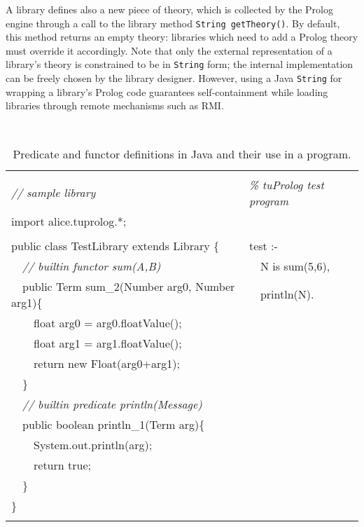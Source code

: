 %
A library defines also a new piece of theory, which is collected
by the Prolog engine through a call to the library method \texttt{String
getTheory()}.
%
By default, this method returns an empty theory: libraries which need to
add a Prolog theory must override it accordingly.
%
Note that only the external representation of a library's theory is
constrained to be in \texttt{String} form; the internal implementation
can be freely chosen by the library designer. However, using a Java
\texttt{String} for wrapping a library's Prolog code guarantees
self-containment while loading libraries through remote mechanisms such
as RMI.

\begin{table}[h]
    \caption{Predicate and functor definitions in Java and their use
    in a \tuprolog{} program.}
    \begin{center}{\small\tt
    \begin{tabular}{p{10cm}|p{3.25cm}}
     \hline
     & \\
    \textit{// sample library} & \textit{\% tuProlog test program}\\
     import alice.tuprolog.*; & \\
     & \\
    public class TestLibrary extends Library \{                            &
 test :-\\
    ~~\textit{// builtin functor sum(A,B)}                          & ~~N is sum(5,6),\\
    ~~public Term sum\_2(Number arg0, Number arg1)\{    & ~~println(N).\\
    ~~~~float   arg0 = arg0.floatValue();        & \\
    ~~~~float   arg1 = arg1.floatValue();        & \\
    ~~~~return new Float(arg0+arg1);                                & \\
    ~~\}                                                            & \\
    ~~\textit{// builtin predicate println(Message)}                & \\
    ~~public boolean println\_1(Term arg)\{                      & \\
    ~~~~System.out.println(arg);                                   & \\
    ~~~~return true;                                                & \\
    ~~\}                                                            & \\
    \}                                                              & \\
     & \\
     \hline
    \end{tabular}
    }\end{center}
\end{table}

